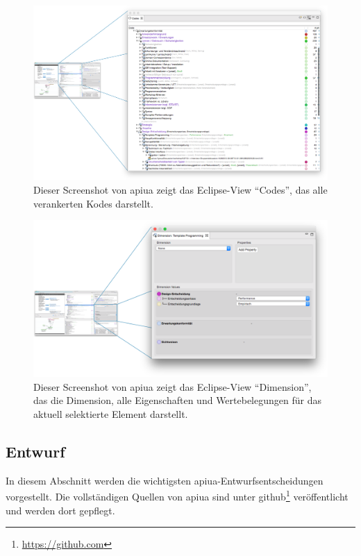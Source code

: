 \begin{figure}
  \centering
    \includegraphics[width=1.0\linewidth]{Figures/apiua/codes.png}
  \caption[APIUA: Kode-Ansicht]{Dieser Screenshot von \gls{apiua} zeigt das Eclipse-View ``Codes'', das alle verankerten Kodes darstellt.}
  \label{fig:apiua-codes}
\end{figure}

\begin{figure}
  \centering
    \includegraphics[width=1.0\linewidth]{Figures/apiua/properties.png}
  \caption[APIUA: Eigenschaften-Ansicht]{Dieser Screenshot von \gls{apiua} zeigt das Eclipse-View ``Dimension'', das die Dimension, alle Eigenschaften und Wertebelegungen für das aktuell selektierte Element darstellt.}
  \label{fig:apiua-properties}
\end{figure}



\subsection{Entwurf}

In diesem Abschnitt werden die wichtigsten \gls{apiua}-Entwurfsentscheidungen vorgestellt. Die vollständigen Quellen von \gls{apiua} sind unter \gls{github}\footnote{\url{https://github.com}} veröffentlicht und werden dort gepflegt.


